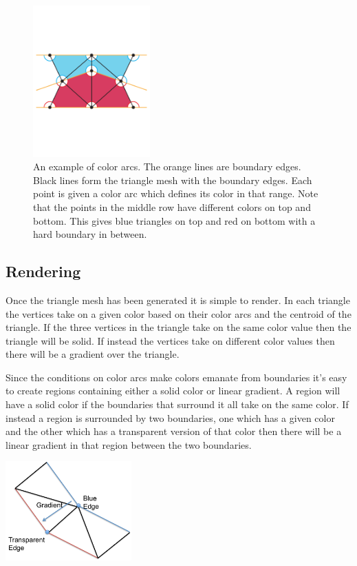 \documentclass[conference]{acmsiggraph}
\begin{document}
\begin{figure}
    \centering
        \includegraphics[width=0.4\textwidth]{images/colorarcs}
    \caption{An example of color arcs. The orange lines are boundary edges. Black lines form the triangle
    mesh with the boundary edges. Each point is given a color arc which defines its color in that range.
    Note that the points in the middle row have different colors on top and bottom. This gives blue
    triangles on top and red on bottom with a hard boundary in between.}
\end{figure}

\subsection{Rendering}
Once the triangle mesh has been generated it is simple to render. In each triangle the vertices
take on a given color based on their color arcs and the centroid of the triangle. If the three
vertices in the triangle take on the same color value then the triangle will be solid. If instead the 
vertices take on different color values then there will be a gradient over the triangle.

Since the conditions on color arcs make colors emanate from boundaries it's easy to create regions
containing either a solid color or linear gradient. A region will have a solid color if the
boundaries that surround it all take on the same color. If instead a region is surrounded by
two boundaries, one which has a given color and the other which has a transparent version of that color
then there will be a linear gradient in that region between the two boundaries.

\includegraphics[height=1.5in]{images/softstrokeboundaryedges}
\end{document}
